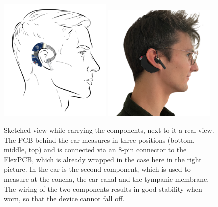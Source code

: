 \begin{figure}[t]
    \centering
    \includegraphics[width=0.48\textwidth]{thesis-doc/images/prototype/prototype_on_head_visual.png}
    \includegraphics[width=0.48\textwidth]{thesis-doc/images/prototype/Lorenz.png}
    \caption{Sketched view while carrying the components, next to it a real view. The PCB behind the ear measures in three positions (bottom, middle, top) and is connected via an 8-pin connector to the FlexPCB, which is already wrapped in the case here in the right picture. In the ear is the second component, which is used to measure at the concha, the ear canal and the tympanic membrane. The wiring of the two components results in good stability when worn, so that the device cannot fall off. }
    \label{fig:design:prototype_on_head_visual}
\end{figure}

